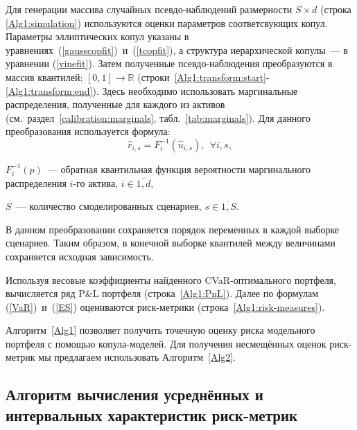 Для генерации массива случайных псевдо-наблюдений размерности \mbox{$S \times d$} (строка \ref{Alg1:simulation}) используются оценки параметров соответсвующих копул.
Параметры эллиптических копул указаны в уравнениях~(\ref{gausscopfit})~и~(\ref{tcopfit}), а структура иерархической копулы~--- в уравнении (\ref{vinefit}).
Затем полученные псевдо-наблюдения преобразуются в массив квантилей: $[0,1] \to \mathbb{R}$ (строки~\ref{Alg1:transform:start}-\ref{Alg1:transform:end}). Здесь необходимо использовать маргинальные распределения, полученные для каждого из активов (см.~раздел~\ref{calibration:marginals}, табл.~\ref{tab:marginals}).
Для данного преобразования используется формула:
\begin{equation} \label{pobs-to-qtile}
    \hat{r}_{i,s} = F^{-1}_i (\hat{u}_{i,s}), \ \
    \forall i, s,
\end{equation}
\begin{where}
    \item $F^{-1}_i (p)$~--- обратная квантильная функция вероятности маргинального распределения $i$-го актива, $i \in \overline{1,d}$,
    \item $S$~--- количество смоделированных сценариев, $s \in \overline{1,S}$.
\end{where}
%
В данном преобразовании сохраняется порядок переменных в каждой выборке сценариев. 
Таким образом, в конечной выборке квантилей между величинами сохраняется исходная зависимость.

Используя весовые коэффициенты найденного CVaR-оптимального портфеля, вычисляется ряд P\&L портфеля (строка~\ref{Alg1:PnL}). Далее по формулам (\ref{VaR})~и~(\ref{ES}) оцениваются %
риск-метрики (строка~\ref{Alg1:risk-measures}). %

Алгоритм~\ref{Alg1} позволяет получить точечную оценку риска модельного портфеля с помощью копула-моделей. %
Для получения несмещённых оценок риск-метрик мы предлагаем использовать %
Алгоритм~\ref{Alg2}.

\subsection{Алгоритм вычисления  усреднённых и интервальных характеристик риск-метрик}
\label{methodology:bootstrap}

